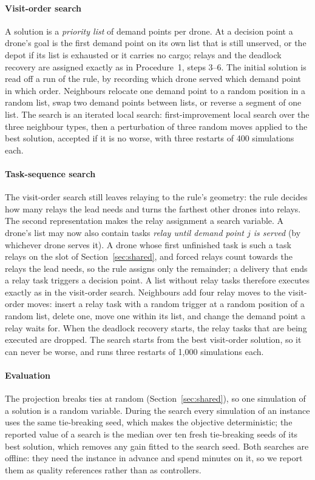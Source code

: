 \documentclass[final,5p,times,twocolumn]{elsarticle}
\begin{document}
\paragraph{Visit-order search}
A solution is a \emph{priority list} of demand points per drone. At a decision point a drone's
goal is the first demand point on its own list that is still unserved, or the depot if its list
is exhausted or it carries no cargo; relays and the deadlock recovery are assigned exactly as in
Procedure~1, steps 3--6. The initial solution is read off a run of the rule, by recording which
drone served which demand point in which order. Neighbours relocate one demand point to a random
position in a random list, swap two demand points between lists, or reverse a segment of one list.
The search is an iterated local search: first-improvement local search over the three neighbour
types, then a perturbation of three random moves applied to the best solution, accepted if it is no
worse, with three restarts of 400 simulations each.

\paragraph{Task-sequence search}
The visit-order search still leaves relaying to the rule's geometry: the rule decides how many
relays the lead needs and turns the farthest other drones into relays. The second representation
makes the relay assignment a search variable. A drone's list may now also contain tasks
\emph{relay until demand point $j$ is served} (by whichever drone serves it). A drone whose first
unfinished task is such a task relays on the slot of Section~\ref{sec:shared}, and forced relays
count towards the relays the lead needs, so the rule assigns only the remainder; a delivery that
ends a relay task triggers a decision point. A list without relay tasks therefore executes exactly
as in the visit-order search. Neighbours add four relay moves to the visit-order moves: insert a
relay task with a random trigger at a random position of a random list, delete one, move one within
its list, and change the demand point a relay waits for. When the deadlock recovery starts, the
relay tasks that are being executed are dropped. The search starts from the best visit-order
solution, so it can never be worse, and runs three restarts of 1{,}000 simulations each.

\paragraph{Evaluation}
The projection breaks ties at random (Section~\ref{sec:shared}), so one simulation of a solution
is a random variable. During the search every simulation of an instance uses the same tie-breaking
seed, which makes the objective deterministic; the reported value of a search is the median over
ten fresh tie-breaking seeds of its best solution, which removes any gain fitted to the search
seed. Both searches are offline: they need the instance in advance and spend minutes on it, so we
report them as quality references rather than as controllers.
\end{document}
